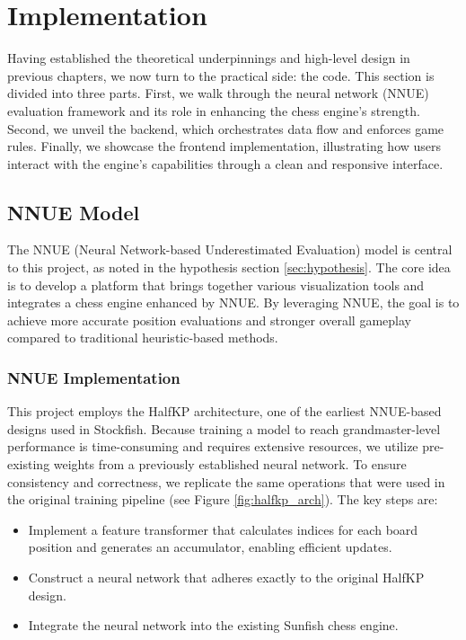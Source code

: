 \documentclass[12pt,a4paper]{article}
\begin{document}
\section{Implementation}
Having established the theoretical underpinnings and high-level design in previous chapters, we now turn to the practical side: the code. This section is divided into three parts. First, we walk through the neural network (NNUE) evaluation framework and its role in enhancing the chess engine’s strength. Second, we unveil the backend, which orchestrates data flow and enforces game rules. Finally, we showcase the frontend implementation, illustrating how users interact with the engine’s capabilities through a clean and responsive interface.
\subsection{NNUE Model}
\label{subsec:nnue_model}

The NNUE (Neural Network-based Underestimated Evaluation) model is central to this project, as noted in the hypothesis section \ref{sec:hypothesis}. The core idea is to develop a platform that brings together various visualization tools and integrates a chess engine enhanced by NNUE. By leveraging NNUE, the goal is to achieve more accurate position evaluations and stronger overall gameplay compared to traditional heuristic-based methods.

\subsubsection{NNUE Implementation}
\label{subsubsec:nnue_implementation}

This project employs the HalfKP architecture, one of the earliest NNUE-based designs used in Stockfish. Because training a model to reach grandmaster-level performance is time-consuming and requires extensive resources, we utilize pre-existing weights from a previously established neural network. To ensure consistency and correctness, we replicate the same operations that were used in the original training pipeline (see Figure \ref{fig:halfkp_arch}). The key steps are:

\begin{itemize}
    \item Implement a feature transformer that calculates indices for each board position and generates an accumulator, enabling efficient updates.
    \item Construct a neural network that adheres exactly to the original HalfKP design.
    \item Integrate the neural network into the existing Sunfish chess engine.
\end{itemize}
\end{document}
